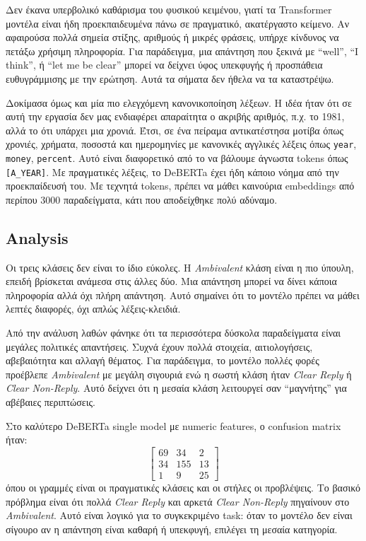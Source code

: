 \documentclass[12pt]{fphw}
\begin{document}
Δεν έκανα υπερβολικό καθάρισμα του φυσικού κειμένου, γιατί τα Transformer μοντέλα είναι ήδη προεκπαιδευμένα πάνω σε πραγματικό, ακατέργαστο κείμενο. Αν αφαιρούσα πολλά σημεία στίξης, αριθμούς ή μικρές φράσεις, υπήρχε κίνδυνος να πετάξω χρήσιμη πληροφορία. Για παράδειγμα, μια απάντηση που ξεκινά με ``well'', ``I think'', ή ``let me be clear'' μπορεί να δείχνει ύφος υπεκφυγής ή προσπάθεια ευθυγράμμισης με την ερώτηση. Αυτά τα σήματα δεν ήθελα να τα καταστρέψω.

Δοκίμασα όμως και μία πιο ελεγχόμενη κανονικοποίηση λέξεων. Η ιδέα ήταν ότι σε αυτή την εργασία δεν μας ενδιαφέρει απαραίτητα ο ακριβής αριθμός, π.χ. το 1981, αλλά το ότι υπάρχει μια χρονιά. Έτσι, σε ένα πείραμα αντικατέστησα μοτίβα όπως χρονιές, χρήματα, ποσοστά και ημερομηνίες με κανονικές αγγλικές λέξεις όπως \texttt{year}, \texttt{money}, \texttt{percent}. Αυτό είναι διαφορετικό από το να βάλουμε άγνωστα tokens όπως \texttt{[A\_YEAR]}. Με πραγματικές λέξεις, το DeBERTa έχει ήδη κάποιο νόημα από την προεκπαίδευσή του. Με τεχνητά tokens, πρέπει να μάθει καινούρια embeddings από περίπου 3000 παραδείγματα, κάτι που αποδείχθηκε πολύ αδύναμο.

\subsection{Analysis}

Οι τρεις κλάσεις δεν είναι το ίδιο εύκολες. Η \emph{Ambivalent} κλάση είναι η πιο ύπουλη, επειδή βρίσκεται ανάμεσα στις άλλες δύο. Μια απάντηση μπορεί να δίνει κάποια πληροφορία αλλά όχι πλήρη απάντηση. Αυτό σημαίνει ότι το μοντέλο πρέπει να μάθει λεπτές διαφορές, όχι απλώς λέξεις-κλειδιά.

Από την ανάλυση λαθών φάνηκε ότι τα περισσότερα δύσκολα παραδείγματα είναι μεγάλες πολιτικές απαντήσεις. Συχνά έχουν πολλά στοιχεία, αιτιολογήσεις, αβεβαιότητα και αλλαγή θέματος. Για παράδειγμα, το μοντέλο πολλές φορές προέβλεπε \emph{Ambivalent} με μεγάλη σιγουριά ενώ η σωστή κλάση ήταν \emph{Clear Reply} ή \emph{Clear Non-Reply}. Αυτό δείχνει ότι η μεσαία κλάση λειτουργεί σαν ``μαγνήτης'' για αβέβαιες περιπτώσεις.

Στο καλύτερο DeBERTa single model με numeric features, ο confusion matrix ήταν:
\[
\begin{bmatrix}
69 & 34 & 2 \\
34 & 155 & 13 \\
1 & 9 & 25
\end{bmatrix}
\]
όπου οι γραμμές είναι οι πραγματικές κλάσεις και οι στήλες οι προβλέψεις. Το βασικό πρόβλημα είναι ότι πολλά \emph{Clear Reply} και αρκετά \emph{Clear Non-Reply} πηγαίνουν στο \emph{Ambivalent}. Αυτό είναι λογικό για το συγκεκριμένο task: όταν το μοντέλο δεν είναι σίγουρο αν η απάντηση είναι καθαρή ή υπεκφυγή, επιλέγει τη μεσαία κατηγορία.
\end{document}
